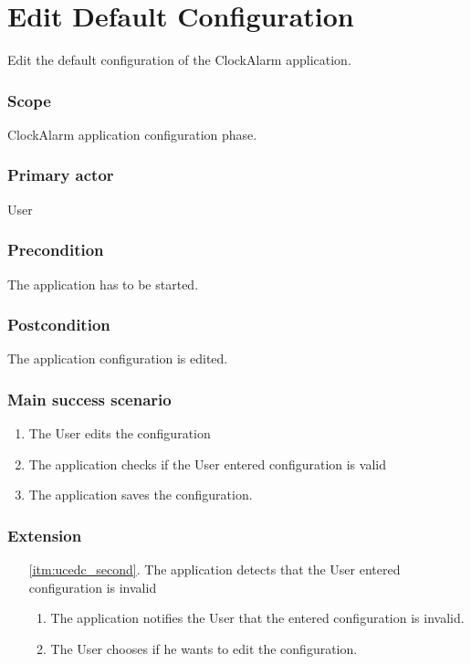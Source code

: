 \section{Edit Default Configuration}\label{subsec:usecase_edit_default_configuration}
Edit the default configuration of the ClockAlarm application.
\subsubsection{Scope}
ClockAlarm application configuration phase.
\subsubsection{Primary actor}
User
\subsubsection{Precondition}
The application has to be started.
\subsubsection{Postcondition}
The application configuration is edited.
\subsubsection{Main success scenario}
\begin{enumerate}
	\item The User edits the configuration
	\item\label{itm:ucedc_second} The application checks if the User entered configuration is valid
	\item The application saves the configuration.
\end{enumerate}
\subsubsection{Extension}
\begin{enumerate}
	\item[\ref{itm:ucedc_second}.] The application detects that the User entered configuration is invalid
		\begin{enumerate}[i]
			\item The application notifies the User that the entered configuration is invalid.
			\item The User chooses if he wants to edit the configuration.
		\end{enumerate}
\end{enumerate}
